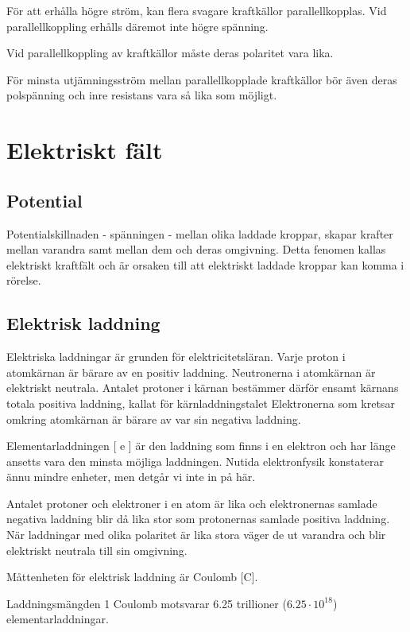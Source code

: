För att erhålla högre ström, kan flera svagare kraftkällor parallellkopplas. Vid
parallellkoppling erhålls däremot inte högre spänning.

Vid parallellkoppling av kraftkällor måste
deras polaritet vara lika.

För minsta utjämningsström mellan parallellkopplade kraftkällor bör även deras
polspänning och inre resistans vara så lika
som möjligt.

\cleardoublepage

\section{Elektriskt fält}

\subsection{Potential}

Potentialskillnaden - spänningen - mellan olika laddade kroppar, skapar krafter mellan
varandra samt mellan dem och deras omgivning. Detta fenomen kallas elektriskt kraftfält och är orsaken till att elektriskt laddade kroppar kan komma i rörelse.

\subsection{Elektrisk laddning}

Elektriska laddningar är grunden för elektricitetsläran. Varje proton i atomkärnan är
bärare av en positiv laddning. Neutronerna i atomkärnan är elektriskt neutrala. Antalet
protoner i kärnan bestämmer därför ensamt kärnans totala positiva laddning, kallat för
kärnladdningstalet Elektronerna som kretsar omkring atomkärnan är bärare av var sin
negativa laddning.

Elementarladdningen [ e ] är den laddning som finns i en elektron och har länge
ansetts vara den minsta möjliga laddningen. Nutida elektronfysik konstaterar ännu
mindre enheter, men detgår vi inte in på här.

Antalet protoner och elektroner i en atom är lika och elektronernas samlade negativa
laddning blir då lika stor som protonernas samlade positiva laddning. När laddningar med
olika polaritet är lika stora väger de ut varandra och blir elektriskt neutrala till sin
omgivning.

Måttenheten för elektrisk laddning är Coulomb [C].

Laddningsmängden 1 Coulomb motsvarar 6.25 trillioner ($6.25\cdot10^{18} $) elementarladdningar.

